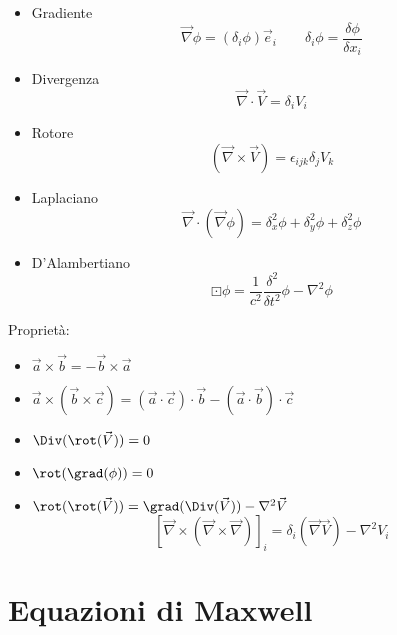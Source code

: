 \begin{itemize}
    \item Gradiente
    \begin{equation*}
        \vec{\nabla}\phi = (\delta_i\phi)\vec{e}_i \qquad \delta_i\phi= \frac{\delta \phi}{\delta x_i}
    \end{equation*}
    \item Divergenza
    \begin{equation*}
        \vec{\nabla}\cdot\vec{V} = \delta_i V_i
    \end{equation*}
    \item Rotore 
    \begin{equation*}
        {(\vec{\nabla}\times \vec{V})} = \epsilon_{ijk}\delta_j V_k
    \end{equation*}
    \item Laplaciano
    \begin{equation*}
        \vec{\nabla}\cdot (\vec{\nabla}\phi) = \delta^2_x \phi + \delta^2_y \phi + \delta^2_z \phi 
    \end{equation*}
    \item D'Alambertiano
    \begin{equation*}
        \boxdot\phi = \frac{1}{c^2}\frac{\delta^2}{\delta t^2}\phi -\nabla^2\phi 
    \end{equation*}
\end{itemize}
Proprietà:
\begin{itemize}
    \item $\vec{a} \times \vec{b} = -\vec{b} \times \vec{a}$
    \item $\vec{a} \times (\vec{b} \times \vec{c}) = (\vec{a} \cdot \vec{c})\cdot \vec{b} - (\vec{a}\cdot \vec{b})\cdot \vec{c}$
    \item $\Div(\rot(\vec{V})) =0$
    \item $\rot(\grad(\phi)) = 0$
    \item $\rot(\rot(\vec{V})) = \grad(\Div(\vec{V}))- \nabla^2\vec{V}$
    \begin{equation*}
        {[\vec{\nabla} \times (\vec{\nabla} \times \vec{\nabla})]}_i = \delta_i(\vec{\nabla}\vec{V})-\nabla^2V_i
    \end{equation*}
\end{itemize}

\section*{Equazioni di Maxwell}

